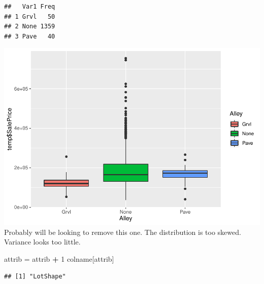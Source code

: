 \documentclass[]{article}
\newenvironment{Shaded}{\begin{snugshade}}{\end{snugshade}}
\newcommand{\DecValTok}[1]{\textcolor[rgb]{0.00,0.00,0.81}{#1}}
\newcommand{\StringTok}[1]{\textcolor[rgb]{0.31,0.60,0.02}{#1}}
\newcommand{\OperatorTok}[1]{\textcolor[rgb]{0.81,0.36,0.00}{\textbf{#1}}}
\newcommand{\NormalTok}[1]{#1}
\begin{document}
\begin{verbatim}
##   Var1 Freq
## 1 Grvl   50
## 2 None 1359
## 3 Pave   40
\end{verbatim}

\includegraphics{EDA_files/figure-latex/unnamed-chunk-29-1.pdf} Probably
will be looking to remove this one. The distribution is too skewed.
Variance looks too little.

\begin{Shaded}
\begin{Highlighting}[]
\NormalTok{attrib =}\StringTok{ }\NormalTok{attrib }\OperatorTok{+}\StringTok{ }\DecValTok{1}
\NormalTok{colname[attrib]}
\end{Highlighting}
\end{Shaded}

\begin{verbatim}
## [1] "LotShape"
\end{verbatim}
\end{document}
